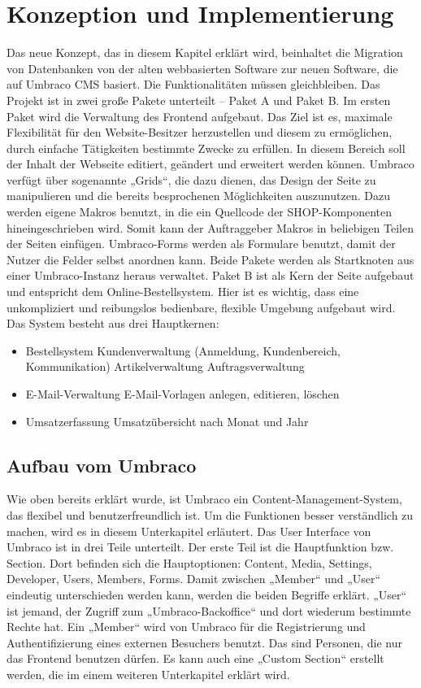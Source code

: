\chapter{Konzeption und Implementierung}

Das neue Konzept, das in diesem Kapitel erklärt wird, beinhaltet die Migration von Datenbanken von der alten webbasierten Software zur neuen Software, die auf Umbraco CMS basiert. Die Funktionalitäten müssen gleichbleiben. Das Projekt ist in zwei große Pakete unterteilt – Paket A und Paket B. Im ersten Paket wird die Verwaltung des Frontend aufgebaut. Das Ziel ist es, maximale Flexibilität für den Website-Besitzer herzustellen und diesem zu ermöglichen, durch einfache Tätigkeiten bestimmte Zwecke zu erfüllen. In diesem Bereich soll der Inhalt der Webseite editiert, geändert und erweitert werden können. Umbraco verfügt über sogenannte „Grids“, die dazu dienen, das Design der Seite zu manipulieren und die bereits besprochenen Möglichkeiten auszunutzen. Dazu werden eigene Makros benutzt, in die ein Quellcode der SHOP-Komponenten hineingeschrieben wird. Somit kann der Auftraggeber Makros in beliebigen Teilen der Seiten einfügen. Umbraco-Forms werden als Formulare benutzt, damit der Nutzer die Felder selbst anordnen kann. Beide Pakete werden als Startknoten aus einer Umbraco-Instanz heraus verwaltet. Paket B ist als Kern der Seite aufgebaut und entspricht dem Online-Bestellsystem. Hier ist es wichtig, dass eine unkompliziert und reibungslos bedienbare, flexible Umgebung aufgebaut wird. Das System besteht aus drei Hauptkernen:
 
\begin{itemize}	
	\item Bestellsystem
	\subitem Kundenverwaltung (Anmeldung, Kundenbereich, Kommunikation)
	\subitem Artikelverwaltung
	\subitem Auftragsverwaltung
	\item E-Mail-Verwaltung
	\subitem E-Mail-Vorlagen anlegen, editieren, löschen
	\item Umsatzerfassung
	\subitem Umsatzübersicht nach Monat und Jahr
\end{itemize}

\section{Aufbau vom Umbraco}

Wie oben bereits erklärt wurde, ist Umbraco \cite{Wahlberg2011} ein Content-Management-System, das flexibel und benutzerfreundlich ist. Um die Funktionen besser verständlich zu machen, wird es in diesem Unterkapitel erläutert.
Das User Interface von Umbraco ist in drei Teile unterteilt. Der erste Teil ist die Hauptfunktion bzw. Section. Dort befinden sich die Hauptoptionen: Content, Media, Settings, Developer, Users, Members, Forms. Damit zwischen „Member“ und „User“ eindeutig unterschieden werden kann, werden die beiden Begriffe erklärt. „User“ ist jemand, der Zugriff zum „Umbraco-Backoffice“ und dort wiederum bestimmte Rechte hat.
Ein „Member“ wird von Umbraco für die Registrierung und Authentifizierung eines externen Besuchers benutzt. Das sind Personen, die nur das Frontend benutzen dürfen. Es kann auch eine „Custom Section“ erstellt werden, die im einem weiteren Unterkapitel erklärt wird. 


